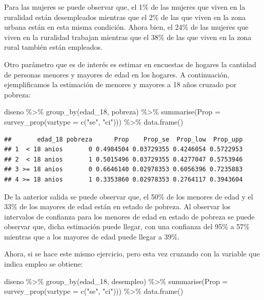 \documentclass[
  12pt,
]{book}
\newenvironment{Shaded}{\begin{snugshade}}{\end{snugshade}}
\newcommand{\AttributeTok}[1]{\textcolor[rgb]{0.77,0.63,0.00}{#1}}
\newcommand{\FunctionTok}[1]{\textcolor[rgb]{0.00,0.00,0.00}{#1}}
\newcommand{\NormalTok}[1]{#1}
\newcommand{\SpecialCharTok}[1]{\textcolor[rgb]{0.00,0.00,0.00}{#1}}
\newcommand{\StringTok}[1]{\textcolor[rgb]{0.31,0.60,0.02}{#1}}
\begin{document}
Para las mujeres se puede observar que, el 1\% de las mujeres que viven en la ruralidad están desempleados mientras que el 2\% de las que viven en la zona urbana están en esta misma condición. Ahora bien, el 24\% de las mujeres que viven en la ruralidad trabajan mientras que el 38\% de las que viven en la zona rural también están empleados.

Otro parámetro que es de interés es estimar en encuestas de hogares la cantidad de personas menores y mayores de edad en los hogares. A continuación, ejemplificamos la estimación de menores y mayores a 18 años cruzado por pobreza:

\begin{Shaded}
\begin{Highlighting}[]
\NormalTok{diseno }\SpecialCharTok{\%\textgreater{}\%} \FunctionTok{group\_by}\NormalTok{(edad\_18, pobreza) }\SpecialCharTok{\%\textgreater{}\%} 
           \FunctionTok{summarise}\NormalTok{(}\AttributeTok{Prop =} \FunctionTok{survey\_prop}\NormalTok{(}\AttributeTok{vartype =}  \FunctionTok{c}\NormalTok{(}\StringTok{"se"}\NormalTok{, }\StringTok{"ci"}\NormalTok{))) }\SpecialCharTok{\%\textgreater{}\%}
           \FunctionTok{data.frame}\NormalTok{()}
\end{Highlighting}
\end{Shaded}

\begin{verbatim}
##       edad_18 pobreza      Prop    Prop_se  Prop_low  Prop_upp
## 1  < 18 anios       0 0.4984504 0.03729355 0.4246054 0.5722953
## 2  < 18 anios       1 0.5015496 0.03729355 0.4277047 0.5753946
## 3 >= 18 anios       0 0.6646140 0.02978353 0.6056396 0.7235883
## 4 >= 18 anios       1 0.3353860 0.02978353 0.2764117 0.3943604
\end{verbatim}

De la anterior salida se puede observar que, el 50\% de los menores de edad y el 33\% de los mayores de edad están en estado de pobreza. Al observar los intervalos de confianza para los menores de edad en estado de pobreza se puede observar que, dicha estimación puede llegar, con una confianza del 95\% a 57\% mientras que a los mayores de edad puede llegar a 39\%.

Ahora, si se hace este mismo ejercicio, pero esta vez cruzando con la variable que indica empleo se obtiene:

\begin{Shaded}
\begin{Highlighting}[]
\NormalTok{diseno }\SpecialCharTok{\%\textgreater{}\%} \FunctionTok{group\_by}\NormalTok{(edad\_18, desempleo) }\SpecialCharTok{\%\textgreater{}\%} 
           \FunctionTok{summarise}\NormalTok{(}\AttributeTok{Prop =} \FunctionTok{survey\_prop}\NormalTok{(}\AttributeTok{vartype =}  \FunctionTok{c}\NormalTok{(}\StringTok{"se"}\NormalTok{, }\StringTok{"ci"}\NormalTok{))) }\SpecialCharTok{\%\textgreater{}\%}
           \FunctionTok{data.frame}\NormalTok{()}
\end{Highlighting}
\end{Shaded}
\end{document}
